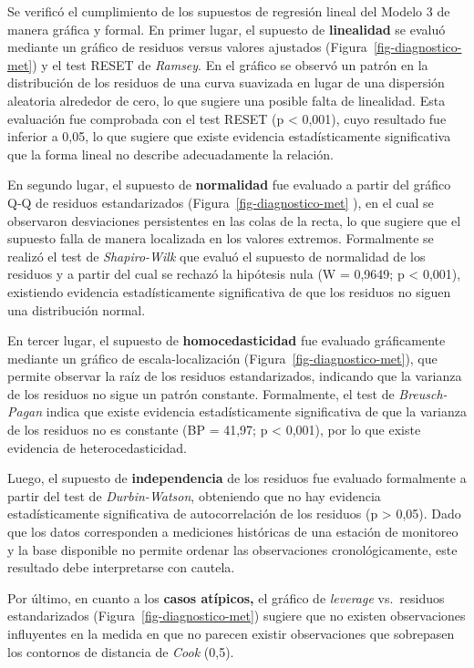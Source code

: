 \documentclass[
  spanish,
  letterpaper,
  DIV=11,
  numbers=noendperiod]{scrartcl}
\begin{document}
Se verificó el cumplimiento de los supuestos de regresión lineal del
Modelo 3 de manera gráfica y formal. En primer lugar, el supuesto de
\textbf{linealidad} se evaluó mediante un gráfico de residuos versus
valores ajustados (Figura~\ref{fig-diagnostico-met}) y el test RESET de
\emph{Ramsey}. En el gráfico se observó un patrón en la distribución de
los residuos de una curva suavizada en lugar de una dispersión aleatoria
alrededor de cero, lo que sugiere una posible falta de linealidad. Esta
evaluación fue comprobada con el test RESET (p \textless{} 0,001), cuyo
resultado fue inferior a 0,05, lo que sugiere que existe evidencia
estadísticamente significativa que la forma lineal no describe
adecuadamente la relación.

En segundo lugar, el supuesto de \textbf{normalidad} fue evaluado a
partir del gráfico Q-Q de residuos estandarizados
(Figura~\ref{fig-diagnostico-met} ), en el cual se observaron
desviaciones persistentes en las colas de la recta, lo que sugiere que
el supuesto falla de manera localizada en los valores extremos.
Formalmente se realizó el test de \emph{Shapiro-Wilk} que evaluó el
supuesto de normalidad de los residuos y a partir del cual se rechazó la
hipótesis nula (W = 0,9649; p \textless{} 0,001), existiendo evidencia
estadísticamente significativa de que los residuos no siguen una
distribución normal.

En tercer lugar, el supuesto de \textbf{homocedasticidad} fue evaluado
gráficamente mediante un gráfico de escala-localización
(Figura~\ref{fig-diagnostico-met}), que permite observar la raíz de los
residuos estandarizados, indicando que la varianza de los residuos no
sigue un patrón constante. Formalmente, el test de \emph{Breusch-Pagan}
indica que existe evidencia estadísticamente significativa de que la
varianza de los residuos no es constante (BP = 41,97; p \textless{}
0,001), por lo que existe evidencia de heterocedasticidad.

Luego, el supuesto de \textbf{independencia} de los residuos fue
evaluado formalmente a partir del test de \emph{Durbin-Watson},
obteniendo que no hay evidencia estadísticamente significativa de
autocorrelación de los residuos (p \textgreater{} 0,05). Dado que los
datos corresponden a mediciones históricas de una estación de monitoreo
y la base disponible no permite ordenar las observaciones
cronológicamente, este resultado debe interpretarse con cautela.

Por último, en cuanto a los \textbf{casos atípicos,} el gráfico de
\emph{leverage} vs.~residuos estandarizados
(Figura~\ref{fig-diagnostico-met}) sugiere que no existen observaciones
influyentes en la medida en que no parecen existir observaciones que
sobrepasen los contornos de distancia de \emph{Cook} (0,5).
\end{document}
